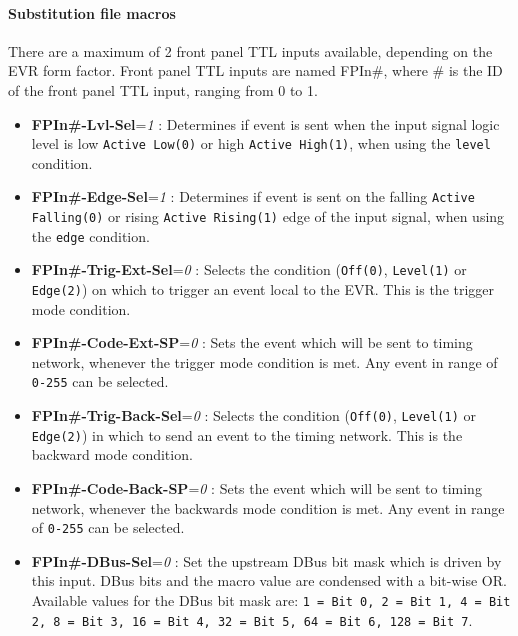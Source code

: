 \documentclass[12pt,a4paper]{article}
\begin{document}
\paragraph{Substitution file macros}
There are a maximum of 2 front panel TTL inputs available, depending on the EVR form factor. Front panel TTL inputs are named FPIn\#, where \# is the ID of the front panel TTL input, ranging from 0 to 1.
\begin{itemize}
  \item
    \textbf{FPIn\#-Lvl-Sel}=\emph{1} : Determines if event is sent when the input signal logic level is low \texttt{Active Low(0)} or high \texttt{Active High(1)}, when using the \texttt{level} condition.
  \item
    \textbf{FPIn\#-Edge-Sel}=\emph{1} : Determines if event is sent on the falling \texttt{Active Falling(0)} or rising \texttt{Active Rising(1)} edge of the input signal, when using the \texttt{edge} condition.
  \item
    \textbf{FPIn\#-Trig-Ext-Sel}=\emph{0} : Selects the condition (\texttt{Off(0)}, \texttt{Level(1)} or \texttt{Edge(2)}) on which to trigger an event local to the EVR. This is the trigger mode condition.
  \item
    \textbf{FPIn\#-Code-Ext-SP}=\emph{0} : Sets the event which will be sent to timing network, whenever the trigger mode condition is met. Any event in range of \texttt{0-255} can be selected.
  \item
    \textbf{FPIn\#-Trig-Back-Sel}=\emph{0} : Selects the condition (\texttt{Off(0)}, \texttt{Level(1)} or \texttt{Edge(2)}) in which to send an event to the timing network. This is the backward mode condition.
  \item
    \textbf{FPIn\#-Code-Back-SP}=\emph{0} : Sets the event which will be sent to timing network, whenever the backwards mode condition is met. Any event in range of \texttt{0-255} can be selected.
  \item
    \textbf{FPIn\#-DBus-Sel}=\emph{0} : Set the upstream DBus bit mask which is driven by this input. DBus bits and the macro value are condensed with a bit-wise OR. Available values for the DBus bit mask are: \texttt{1 = Bit 0, 2 = Bit 1, 4 = Bit 2, 8 = Bit 3, 16 = Bit 4, 32 = Bit 5, 64 = Bit 6, 128 = Bit 7}.
  \end{itemize}
  
  
\end{document}
